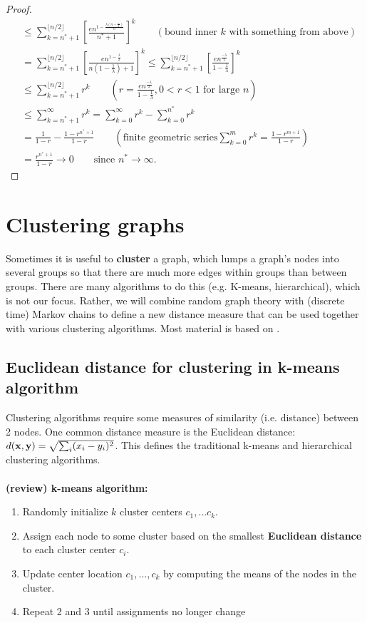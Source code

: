 \documentclass[./some_latex_template.tex]{subfiles}
\begin{document}
\begin{proof}
\begin{align*}
	&\le \sum_{k=n^* + 1}^{\lfloor n/2 \rfloor} \left[ \frac{en^{1-\frac{\lambda (n - \frac{n}{2})}{n}}}{n^* + 1}\right]^k \qquad (\text{bound inner } k \text{  with something from above})\\
	&= \sum_{k=n^* + 1}^{\lfloor n/2 \rfloor} \left[\frac{en^{1 - \frac{\lambda}{2}}}{n(1 - \frac{1}{\lambda}) + 1}\right]^k \le \sum_{k=n^* + 1}^{\lfloor n/2 \rfloor} \left[\frac{en^{\frac{-\lambda}{2}}}{1 - \frac{1}{\lambda}}\right]^k\\
	&\le \sum_{k=n^* + 1}^{\lfloor n/2 \rfloor}  r^k \qquad (r = \frac{en^{\frac{-\lambda}{2}}}{1 - \frac{1}{\lambda}}, 0 < r < 1 \text{ for large }n)\\
	&\le \sum_{k=n^* + 1}^{\infty}r^k  = \sum_{k=0}^{\infty}r^k - \sum_{k=0}^{n^*}r^k\\
	&= \frac{1}{1-r} - \frac{1-r^{n^*+1}}{1-r} \qquad \left(\text{finite geometric series} \sum_{k=0}^{m}r^k = \frac{1-r^{m+1}}{1-r}\right)\\
	&= \frac{r^{n^* + 1}}{1-r} \longrightarrow 0 \qquad \text{since } n^* \rightarrow \infty.
\end{align*}
\end{proof}

\section{Clustering graphs}

Sometimes it is useful to \textbf{cluster} a graph, which lumps a graph's nodes into several groups so that there are much more edges within groups than between groups. There are many algorithms to do this (e.g. K-means, hierarchical), which is not our focus. Rather, we will combine random graph theory with (discrete time) Markov chains to define a new distance measure that can be used together with various clustering algorithms. Most material is based on \cite{yen2005clustering}. 

\subsection{Euclidean distance for clustering in k-means algorithm}

Clustering algorithms require some measures of similarity (i.e. distance) between 2 nodes. One common distance measure is the Euclidean distance: $d(\mathbf{x}, \mathbf{y}) = \sqrt{\sum_{i}(x_i - y_i)^2}$. This defines the traditional k-means and hierarchical clustering algorithms.\\
\\
\textbf{(review) k-means algorithm:}
\begin{enumerate}
	\item Randomly initialize $k$ cluster centers $c_1,...c_k$. 
	\item Assign each node to some cluster based on the smallest \textbf{Euclidean distance} to each cluster center $c_i$.
	\item Update center location $c_1, ..., c_k$ by computing the means of the nodes in the cluster. 
	\item Repeat 2 and 3 until assignments no longer change
\end{enumerate}
\end{document}
